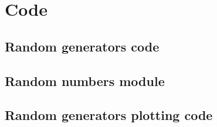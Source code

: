 \documentclass[twocolumn]{myarticle}
\begin{document}

\onecolumn

\section{Code}
\label{sec:code}

\subsection{Random generators code}
\label{subsec:random_generators_code}


\vspace{10pt}

\subsection{Random numbers module}
\label{subsec:random_numbers_module}


\vspace{10pt}

\subsection{Random generators plotting code}
\label{subsec:random_generators_plotting_code}


\vspace{10pt}
\end{document}
